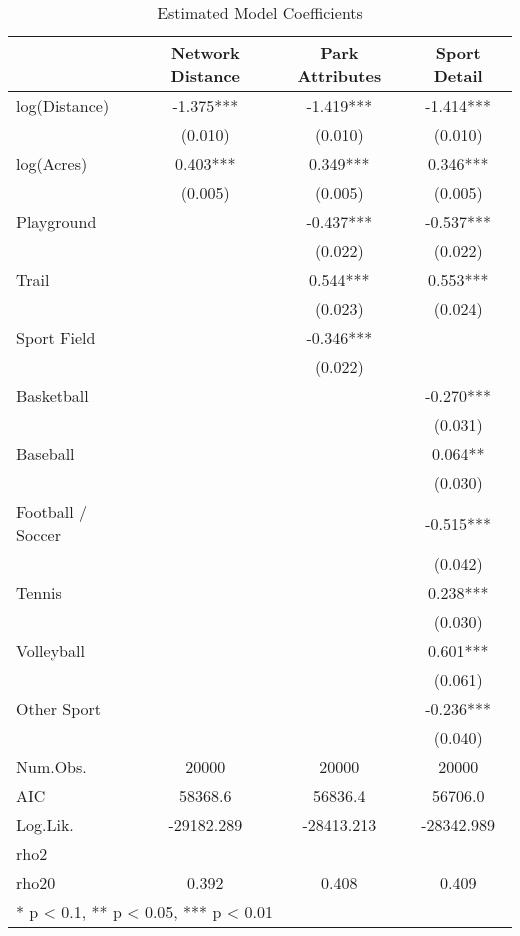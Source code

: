 \documentclass[3p, authoryear, review]{elsarticle} %
\begin{document}
\begin{table}

\caption{\label{tab:base-modelsummary}Estimated Model Coefficients}
\centering
\begin{tabular}[t]{lccc}
\toprule
  & Network Distance & Park Attributes & Sport Detail\\
\midrule
log(Distance) & -1.375*** & -1.419*** & -1.414***\\
 & (0.010) & (0.010) & (0.010)\\
log(Acres) & 0.403*** & 0.349*** & 0.346***\\
 & (0.005) & (0.005) & (0.005)\\
Playground &  & -0.437*** & -0.537***\\
 &  & (0.022) & (0.022)\\
Trail &  & 0.544*** & 0.553***\\
 &  & (0.023) & (0.024)\\
Sport Field &  & -0.346*** & \\
 &  & (0.022) & \\
Basketball &  &  & -0.270***\\
 &  &  & (0.031)\\
Baseball &  &  & 0.064**\\
 &  &  & \vphantom{1} (0.030)\\
Football / Soccer &  &  & -0.515***\\
 &  &  & (0.042)\\
Tennis &  &  & 0.238***\\
 &  &  & (0.030)\\
Volleyball &  &  & 0.601***\\
 &  &  & (0.061)\\
Other Sport &  &  & -0.236***\\
 &  &  & (0.040)\\
\midrule
Num.Obs. & 20000 & 20000 & 20000\\
AIC & 58368.6 & 56836.4 & 56706.0\\
Log.Lik. & -29182.289 & -28413.213 & -28342.989\\
rho2 &  &  & \\
rho20 & 0.392 & 0.408 & 0.409\\
\bottomrule
\multicolumn{4}{l}{\textsuperscript{} * p < 0.1, ** p < 0.05, *** p < 0.01}\\
\end{tabular}
\end{table}
\end{document}
